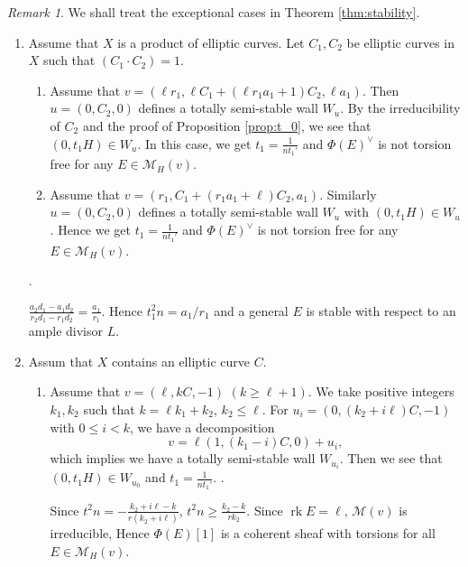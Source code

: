 \documentclass[10pt]{amsart}
\def\cal{\mathcal}
\newenvironment{NB}{
\color{red}{\bf NB}. \footnotesize 
}{}
\newcommand{\rk}{\operatorname{rk}}
\numberwithin{equation}{section}
\theoremstyle{plain}
\theoremstyle{definition}
\theoremstyle{remark}
\newtheorem{rem}[thm]{Remark}
\begin{document}
\begin{rem}\label{rem:exc}
We shall treat the exceptional cases in Theorem \ref{thm:stability}.
\begin{enumerate}
\item[(1)]
Assume that $X$ is a product of elliptic curves.
Let $C_1,C_2$ be elliptic curves in $X$ such that $(C_1 \cdot C_2)=1$.
\begin{enumerate}
\item
Assume that $v=(\ell r_1,\ell C_1+(\ell r_1 a_1+1)C_2,\ell a_1)$.
Then $u=(0,C_2,0)$ defines a totally semi-stable wall $W_u$.
By the irreducibility of $C_2$ and the proof of Proposition \ref{prop:t_0}, we see that $(0,t_1 H) \in W_u$.
In this case, we get $t_1=\frac{1}{nt_1'}$ and 
$\Phi(E)^{\vee}$ is not torsion free for any $E \in {\cal M}_H(v)$.
\item
Assume that $v=(r_1,C_1+(r_1 a_1 +\ell)C_2,a_1)$.
Similarly $u=(0,C_2,0)$ defines a totally semi-stable wall $W_u$ with $(0,t_1 H) \in W_u$.
Hence we get $t_1=\frac{1}{nt_1'}$ and 
$\Phi(E)^{\vee}$ is not torsion free for any $E \in {\cal M}_H(v)$.
\end{enumerate}
\begin{NB}
$\frac{a_2 d_1-a_1 d_2}{r_2 d_1-r_1 d_2}=\frac{a_1}{r_1}$.
Hence $t_1^2 n=a_1/r_1$ and a general $E$ is stable with respect to
an ample divisor $L$. 
\end{NB}
\item[(2)]
Assum  that $X$ contains an elliptic curve $C$. 
\begin{enumerate}
\item
Assume that $v=(\ell,k C,-1)$ $(k \geq \ell+1)$.
We take positive integers $k_1, k_2$ such that
$k=\ell k_1+k_2$, $k_2 \leq \ell$. 
For $u_i=(0,(k_2+i\ell)C,-1)$ with $0 \leq i<k$,
we have a decomposition
$$
v=\ell (1,(k_1-i)C,0)+u_i, 
$$
which implies we have a totally semi-stable wall $W_{u_i}$.
Then we see that $(0,t_1 H) \in W_{u_0}$ and $t_1=\frac{1}{nt_1'}$.
\begin{NB}
Since $t^2 n=-\frac{k_2+i \ell -k}{r(k_2+i \ell)}$, $t^2 n \geq \frac{k_2-k}{rk_2}$.
\end{NB} 
Since $\rk E=\ell$, ${\cal M}(v)$ is irreducible,
Hence $\Phi(E)[1]$ is a coherent sheaf with torsions for all
$E \in {\cal M}_H(v)$.

\end{enumerate}
\end{enumerate}
\end{rem}
\end{document}
